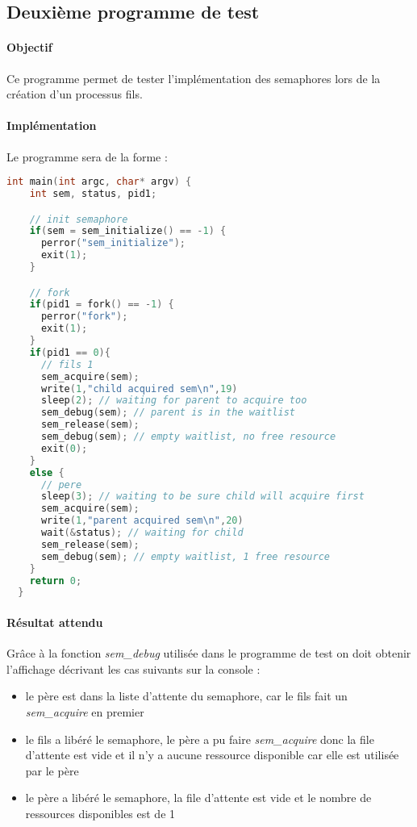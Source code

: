 \documentclass[12pt]{article}
\begin{document}
  \newpage
  \subsection{Deuxième programme de test}
  \paragraph{Objectif\\}
  Ce programme permet de tester l'implémentation des semaphores lors de la création d'un processus fils.
  \paragraph{Implémentation\\}
  Le programme sera de la forme :
  \begin{lstlisting}[language=C]
  int main(int argc, char* argv) {
    int sem, status, pid1;

    // init semaphore
    if(sem = sem_initialize() == -1) {
      perror("sem_initialize");
      exit(1);
    }

    // fork
    if(pid1 = fork() == -1) {
      perror("fork");
      exit(1);
    }
    if(pid1 == 0){
      // fils 1
      sem_acquire(sem);
      write(1,"child acquired sem\n",19)
      sleep(2); // waiting for parent to acquire too
      sem_debug(sem); // parent is in the waitlist
      sem_release(sem);
      sem_debug(sem); // empty waitlist, no free resource
      exit(0);
    }
    else {
      // pere
      sleep(3); // waiting to be sure child will acquire first
      sem_acquire(sem);
      write(1,"parent acquired sem\n",20)
      wait(&status); // waiting for child
      sem_release(sem);
      sem_debug(sem); // empty waitlist, 1 free resource
    }
    return 0;
  }
  \end{lstlisting}
  \paragraph{Résultat attendu\\}
  Grâce à la fonction \textit{sem\_debug} utilisée dans le programme de test on doit obtenir l'affichage décrivant les cas suivants sur la console :
  \begin{itemize}
    \item le père est dans la liste d'attente du semaphore, car le fils fait un \textit{sem\_acquire} en premier
    \item le fils a libéré le semaphore, le père a pu faire \textit{sem\_acquire} donc la file d'attente est vide et il n'y a aucune ressource disponible car elle est utilisée par le père
    \item le père a libéré le semaphore, la file d'attente est vide et le nombre de ressources disponibles est de 1
  \end{itemize}
\end{document}
